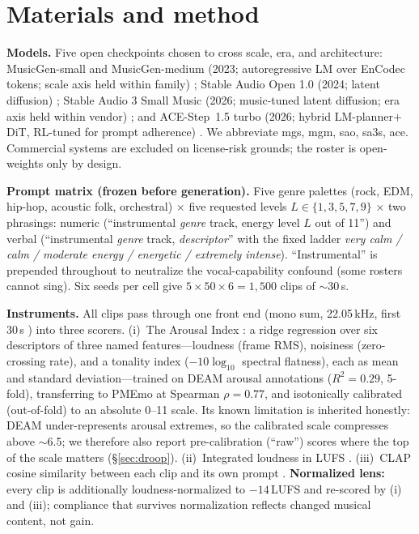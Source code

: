 \documentclass{article}
\newcommand{\inst}{Arousal Index}
\begin{document}
\section{Materials and method}
\label{sec:method}

\textbf{Models.} Five open checkpoints chosen to cross scale, era, and
architecture: MusicGen-small and MusicGen-medium (2023; autoregressive LM over
EnCodec tokens; scale axis held within family) \citep{copet2023musicgen};
Stable Audio Open 1.0 (2024; latent diffusion) \citep{evans2025sao};
Stable Audio 3 Small Music (2026; music-tuned latent diffusion; era axis held
within vendor) \citep{sa3card2026}; and ACE-Step~1.5 turbo (2026; hybrid
LM-planner$+$DiT, RL-tuned for prompt adherence) \citep{gong2026acestep}.
We abbreviate mgs, mgm, sao, sa3s, ace. Commercial systems are excluded on
license-risk grounds; the roster is open-weights only by design.

\textbf{Prompt matrix (frozen before generation).} Five genre palettes
(rock, EDM, hip-hop, acoustic folk, orchestral) $\times$ five requested levels
$L \in \{1,3,5,7,9\}$ $\times$ two phrasings: numeric
(``instrumental \emph{genre} track, energy level $L$ out of 11'') and verbal
(``instrumental \emph{genre} track, \emph{descriptor}'' with the fixed ladder
\emph{very calm / calm / moderate energy / energetic / extremely intense}).
``Instrumental'' is prepended throughout to neutralize the vocal-capability
confound (some rosters cannot sing). Six seeds per cell give
$5{\times}50{\times}6 = 1{,}500$ clips of $\sim$30\,s.

\textbf{Instruments.} All clips pass through one front end (mono sum,
22.05\,kHz, first 30\,s \citep{mcfee2015librosa}) into three scorers.
(i)~The \inst{} \citep{p0aanon}: a ridge regression over six descriptors of
three named features---loudness (frame RMS), noisiness (zero-crossing rate),
and a tonality index ($-10\log_{10}$ spectral flatness), each as mean and
standard deviation---trained on DEAM arousal annotations
\citep{aljanaki2017deam} ($R^2{=}0.29$, 5-fold), transferring to PMEmo
\citep{zhang2018pmemo} at Spearman $\rho{=}0.77$, and isotonically calibrated
(out-of-fold) to an absolute 0--11 scale. Its known limitation is inherited
honestly: DEAM under-represents arousal extremes, so the calibrated scale
compresses above $\sim$6.5; we therefore also report pre-calibration
(``raw'') scores where the top of the scale matters (\S\ref{sec:droop}).
(ii)~Integrated loudness in LUFS \citep{itu2015bs1770,
steinmetz2021pyloudnorm}. (iii)~CLAP cosine similarity between each clip and
its own prompt \citep{wu2023laionclap}. \textbf{Normalized lens:} every clip
is additionally loudness-normalized to $-14$\,LUFS and re-scored by (i) and
(iii); compliance that survives normalization reflects changed musical
content, not gain.
\end{document}
